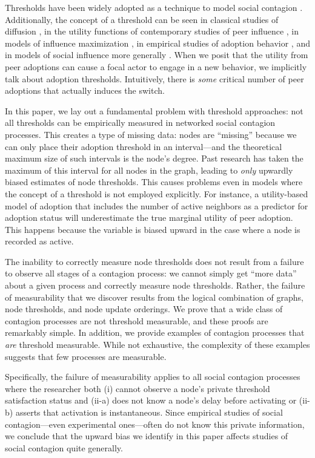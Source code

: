 \documentclass[a4paper]{article}
\begin{document}
Thresholds have been widely adopted as a technique to model social contagion \parencite{Centola2007, Granovetter1978, Watts2002, Greve1995a, Macy1991c}. Additionally, the concept of a threshold can be seen in classical studies of diffusion \parencite{Coleman1957, Rogers1962, Burt2016, Granovetter1986}, in the utility functions of contemporary studies of peer influence \parencite{}, in models of influence maximization \parencite{}, in empirical studies of adoption behavior \parencite{Valente1995, Valente1996, Ludemann1999a, Romero2011}, and in models of social influence more generally \parencite{christakis-fowler, Marsden, Friedkin}. When we posit that the utility from peer adoptions can cause a focal actor to engage in a new behavior, we implicitly talk about adoption thresholds. Intuitively, there is \emph{some} critical number of peer adoptions that actually induces the switch.

In this paper, we lay out a fundamental problem with threshold approaches: not all thresholds can be empirically measured in networked social contagion processes. This creates a type of missing data: nodes are ``missing'' because we can only place their adoption threshold in an interval---and the theoretical maximum size of such intervals is the node's degree. Past research has taken the maximum of this interval for all nodes in the graph, leading to \emph{only} upwardly biased estimates of node thresholds. This causes problems even in models where the concept of a threshold is not employed explicitly. For instance, a utility-based model of adoption that includes the number of active neighbors as a predictor for adoption status will underestimate the true marginal utility of peer adoption. This happens because the variable is biased upward in the case where a node is recorded as active.

The inability to correctly measure node thresholds does not result from a failure to observe all stages of a contagion process: we cannot simply get ``more data'' about a given process and correctly measure node thresholds. Rather, the failure of measurability that we discover results from the logical combination of graphs, node thresholds, and node update orderings. We prove that a wide class of contagion processes are not threshold measurable, and these proofs are remarkably simple. In addition, we provide examples of contagion processes that \emph{are} threshold measurable. While not exhaustive, the complexity of these examples suggests that few processes are measurable.

Specifically, the failure of measurability applies to all social contagion processes where the researcher both (i) cannot observe a node's private threshold satisfaction status and (ii-a) does not know a node's delay before activating or (ii-b) asserts that activation is instantaneous. Since empirical studies of social contagion---even experimental ones---often do not know this private information, we conclude that the upward bias we identify in this paper affects studies of social contagion quite generally.
\end{document}
